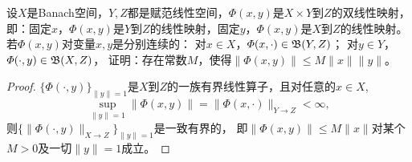 \begin{18}
    设$X$是Banach空间，$Y,Z$都是赋范线性空间，$\varPhi(x,y)$是$X \times Y$到$Z$的双线性映射，
    即：固定$x$，$\varPhi(x,y)$是$Y$到$Z$的线性映射，固定$y$，$\varPhi(x,y)$是$X$到$Z$的线性映射。
    若$\varPhi(x,y)$对变量$x,y$是分别连续的：
    对$x \in X$，$\varPhi(x,\cdot)\in\mathfrak{B}(Y,Z)$；
    对$y \in Y$，$\varPhi(\cdot,y)\in\mathfrak{B}(X,Z)$，
    证明：存在常数$M$，使得$\|\varPhi(x,y)\| \leqslant M\|x\|\|y\|$。
\end{18}
\begin{proof}
    $\{\varPhi(\cdot,y)\}_{\|y\|=1}$是$X$到$Z$的一族有界线性算子，且对任意的$x \in X$,
    \[\sup_{\|y\|=1}\|\varPhi(x,y)\|=\|\varPhi(x,\cdot)\|_{Y \to Z}<\infty,\]
    则$\{\|\varPhi(\cdot,y)\|_{X \to Z}\}_{\|y\|=1}$是一致有界的，
    即$\|\varPhi(x,y)\| \leqslant M\|x\|$对某个$M>0$及一切$\|y\|=1$成立。
\end{proof}

